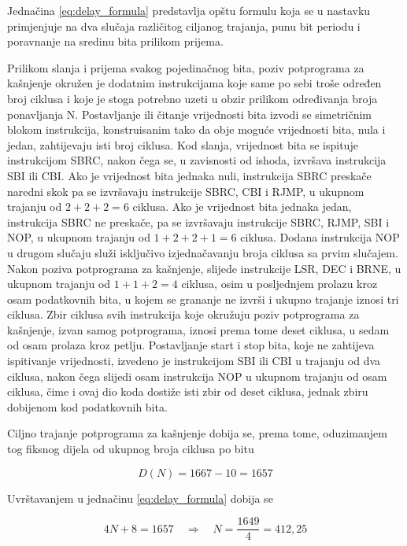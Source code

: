 Jednačina \ref{eq:delay_formula} predstavlja opštu formulu koja se u
nastavku primjenjuje na dva slučaja različitog ciljanog trajanja, punu
bit periodu i poravnanje na sredinu bita prilikom prijema.

Prilikom slanja i prijema svakog pojedinačnog bita, poziv potprograma za
kašnjenje okružen je dodatnim instrukcijama koje same po sebi troše
određen broj ciklusa i koje je stoga potrebno uzeti u obzir prilikom
određivanja broja ponavljanja N. Postavljanje ili čitanje vrijednosti
bita izvodi se simetričnim blokom instrukcija, konstruisanim tako da obje
moguće vrijednosti bita, nula i jedan, zahtijevaju isti broj ciklusa. Kod
slanja, vrijednost bita se ispituje instrukcijom SBRC, nakon čega se, u
zavisnosti od ishoda, izvršava instrukcija SBI ili CBI. Ako je vrijednost
bita jednaka nuli, instrukcija SBRC preskače naredni skok pa se
izvršavaju instrukcije SBRC, CBI i RJMP, u ukupnom trajanju od $2 + 2 +
2 = 6$ ciklusa. Ako je vrijednost bita jednaka jedan, instrukcija SBRC ne
preskače, pa se izvršavaju instrukcije SBRC, RJMP, SBI i NOP, u ukupnom
trajanju od $1 + 2 + 2 + 1 = 6$ ciklusa. Dodana instrukcija NOP u drugom
slučaju služi isključivo izjednačavanju broja ciklusa sa prvim slučajem.
Nakon poziva potprograma za kašnjenje, slijede instrukcije LSR, DEC i
BRNE, u ukupnom trajanju od $1 + 1 + 2 = 4$ ciklusa, osim u posljednjem
prolazu kroz osam podatkovnih bita, u kojem se grananje ne izvrši i
ukupno trajanje iznosi tri ciklusa. Zbir ciklusa svih instrukcija koje
okružuju poziv potprograma za kašnjenje, izvan samog potprograma, iznosi
prema tome deset ciklusa, u sedam od osam prolaza kroz petlju. Postavljanje
start i stop bita, koje ne zahtijeva ispitivanje vrijednosti, izvedeno je
instrukcijom SBI ili CBI u trajanju od dva ciklusa, nakon čega slijedi
osam instrukcija NOP u ukupnom trajanju od osam ciklusa, čime i ovaj dio
koda dostiže isti zbir od deset ciklusa, jednak zbiru dobijenom kod
podatkovnih bita.

Ciljno trajanje potprograma za kašnjenje dobija se, prema tome,
oduzimanjem tog fiksnog dijela od ukupnog broja ciklusa po bitu

\begin{equation}
    D(N) = 1667 - 10 = 1657
\end{equation}

Uvrštavanjem u jednačinu \ref{eq:delay_formula} dobija se

\begin{equation}
    4N + 8 = 1657 \quad \Rightarrow \quad N = \frac{1649}{4} = 412{,}25
\end{equation}

